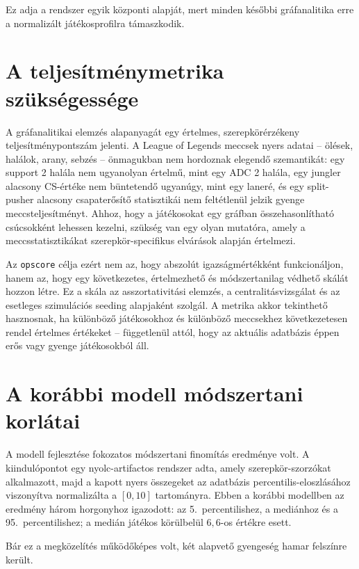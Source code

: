 ﻿\documentclass[a4paper,12pt]{report}
\begin{document}
Ez adja a rendszer egyik központi alapját, mert minden későbbi gráfanalitika erre a normalizált játékosprofilra támaszkodik.

\section{A teljesítménymetrika szükségessége}

A gráfanalitikai elemzés alapanyagát egy értelmes, szerepkörérzékeny teljesítménypontszám jelenti. A League of Legends meccsek nyers adatai -- ölések, halálok, arany, sebzés -- önmagukban nem hordoznak elegendő szemantikát: egy support 2 halála nem ugyanolyan értelmű, mint egy ADC 2 halála, egy jungler alacsony CS-értéke nem büntetendő ugyanúgy, mint egy laneré, és egy split-pusher alacsony csapaterősítő statisztikái nem feltétlenül jelzik gyenge meccsteljesítményt. Ahhoz, hogy a játékosokat egy gráfban összehasonlítható csúcsokként lehessen kezelni, szükség van egy olyan mutatóra, amely a meccsstatisztikákat szerepkör-specifikus elvárások alapján értelmezi.

Az \texttt{opscore} célja ezért nem az, hogy abszolút igazságmértékként funkcionáljon, hanem az, hogy egy következetes, értelmezhető és módszertanilag védhető skálát hozzon létre. Ez a skála az asszortativitási elemzés, a centralitásvizsgálat és az esetleges szimulációs seeding alapjaként szolgál. A metrika akkor tekinthető hasznosnak, ha különböző játékosokhoz és különböző meccsekhez következetesen rendel értelmes értékeket -- függetlenül attól, hogy az aktuális adatbázis éppen erős vagy gyenge játékosokból áll.

\section{A korábbi modell módszertani korlátai}

A modell fejlesztése fokozatos módszertani finomítás eredménye volt. A kiindulópontot egy nyolc-artifactos rendszer adta, amely szerepkör-szorzókat alkalmazott, majd a kapott nyers összegeket az adatbázis percentilis-eloszlásához viszonyítva normalizálta a $[0,10]$ tartományra. Ebben a korábbi modellben az eredmény három horgonyhoz igazodott: az 5.~percentilishez, a mediánhoz és a 95.~percentilishez; a medián játékos körülbelül $6{,}6$-os értékre esett.

Bár ez a megközelítés működőképes volt, két alapvető gyengeség hamar felszínre került.
\end{document}
